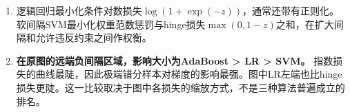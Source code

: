 
\begin{enumerate}[start=1]

\item 逻辑回归最小化条件对数损失\(\log(1+\exp(-z))\)，通常还带有正则化。软间隔SVM最小化权重范数惩罚与hinge损失\(\max(0,1-z)\)之和，在扩大间隔和允许违反约束之间作权衡。

\item \textbf{在原图的远端负间隔区域，影响大小为AdaBoost > LR > SVM。} 指数损失的曲线最陡，因此极端错分样本对梯度的影响最强。图中LR左端也比hinge损失更陡。这一比较取决于图中各损失的缩放方式，不是三种算法普遍成立的排名。

\end{enumerate}

